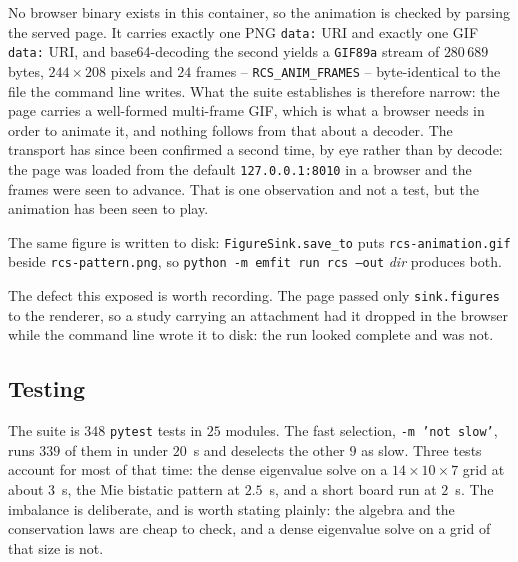 No browser binary exists in this container, so the animation is checked by parsing the served page. It carries exactly
one PNG \texttt{data:} URI and exactly one GIF \texttt{data:} URI, and base64-decoding the second yields a
\texttt{GIF89a} stream of $280\,689$ bytes, $244\times208$ pixels and $24$ frames -- \texttt{RCS\_ANIM\_FRAMES} --
byte-identical to the file the command line writes. What the suite establishes is therefore narrow: the page
carries a well-formed multi-frame GIF, which is what a browser needs in order to animate it, and nothing follows
from that about a decoder. The transport has since been confirmed a second time, by eye rather than by decode:
the page was loaded from the default \texttt{127.0.0.1:8010} in a browser and the frames were seen to advance.
That is one observation and not a test, but the animation has been seen to play.

The same figure is written to disk: \texttt{FigureSink.save\_to} puts \texttt{rcs-animation.gif} beside
\texttt{rcs-pattern.png}, so \texttt{python -m emfit run rcs --out} \emph{dir} produces both.

The defect this exposed is worth recording. The page passed only \texttt{sink.figures} to the renderer, so a study
carrying an attachment had it dropped in the browser while the command line wrote it to disk: the run looked complete
and was not.

\subsection{Testing}
\label{sec:testing}

The suite is $348$ \texttt{pytest} tests in $25$ modules. The fast selection, \texttt{-m 'not slow'}, runs $339$
of them in under $20$~s and deselects the other $9$ as slow. Three tests account for most of that time: the dense
eigenvalue solve on a $14\times10\times7$ grid at about $3$~s, the Mie bistatic pattern at $2.5$~s, and a short
board run at $2$~s. The imbalance is deliberate, and is worth stating plainly: the algebra and the conservation
laws are cheap to check, and a dense eigenvalue solve on a grid of that size is not.

